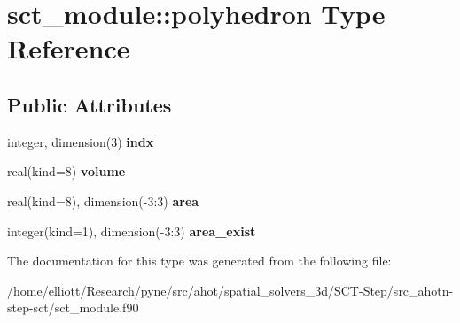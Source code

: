 \hypertarget{structsct__module_1_1polyhedron}{\section{sct\-\_\-module\-:\-:polyhedron Type Reference}
\label{structsct__module_1_1polyhedron}
}
\subsection*{Public Attributes}
\begin{DoxyCompactItemize}
\item 
\hypertarget{structsct__module_1_1polyhedron_a0a9f5f4cc18647a9ebeb2318bc83dfa7}{integer, dimension(3) {\bfseries indx}}\label{structsct__module_1_1polyhedron_a0a9f5f4cc18647a9ebeb2318bc83dfa7}

\item 
\hypertarget{structsct__module_1_1polyhedron_afc1244f7652724346f6ce31ff39214c3}{real(kind=8) {\bfseries volume}}\label{structsct__module_1_1polyhedron_afc1244f7652724346f6ce31ff39214c3}

\item 
\hypertarget{structsct__module_1_1polyhedron_ad7c601a870a982c8a0b30bd2ee3b1427}{real(kind=8), dimension(-\/3\-:3) {\bfseries area}}\label{structsct__module_1_1polyhedron_ad7c601a870a982c8a0b30bd2ee3b1427}

\item 
\hypertarget{structsct__module_1_1polyhedron_a4d8b6322e32640812e3c917645febc0b}{integer(kind=1), dimension(-\/3\-:3) {\bfseries area\-\_\-exist}}\label{structsct__module_1_1polyhedron_a4d8b6322e32640812e3c917645febc0b}

\end{DoxyCompactItemize}


The documentation for this type was generated from the following file\-:\begin{DoxyCompactItemize}
\item 
/home/elliott/\-Research/pyne/src/ahot/spatial\-\_\-solvers\-\_\-3d/\-S\-C\-T-\/\-Step/src\-\_\-ahotn-\/step-\/sct/sct\-\_\-module.\-f90\end{DoxyCompactItemize}
